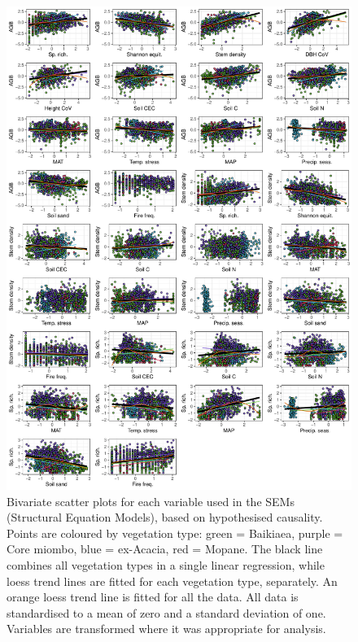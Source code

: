 \begin{refsection}
\begin{supplement}
\begin{figure}[H]
	\includegraphics[width=0.9\linewidth]{img/bivar_lm}
	\caption[Bivariate scatter plots of observed variables]{Bivariate scatter plots for each variable used in the SEMs (Structural Equation Models), based on hypothesised causality. Points are coloured by vegetation type: green = Baikiaea, purple = Core miombo, blue = ex-Acacia, red = Mopane. The black line combines all vegetation types in a single linear regression, while loess trend lines are fitted for each vegetation type, separately. An orange loess trend line is fitted for all the data. All data is standardised to a mean of zero and a standard deviation of one. Variables are transformed where it was appropriate for analysis.}
	\label{befr:bivar_lm}
\end{figure}


\end{supplement}
\end{refsection}
